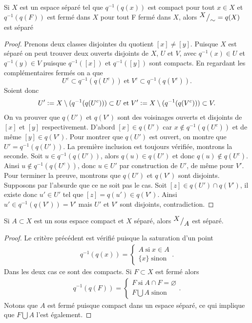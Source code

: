 \documentclass[main.tex]{subfiles}
\begin{document}
	\begin{prop}
		Si $X$ est un espace séparé tel que $q^{-1}(q(x))$ est compact pour tout  $x\in X$ et $q^{-1}(q(F))$ est fermé dans $X$ pour tout F fermé dans $X$, alors ${^{\textstyle X}\big/_{\textstyle \sim}} = q(X)$ est séparé
	\end{prop}
	\begin{proof}
		Prenons deux classes disjointes du quotient $[x] \neq [y]$. Puisque $X$ est séparé on peut trouver deux ouverts disjoints de $X$, $U$ et $V$, avec $q^{-1}(x) \in U$ et  $q^{-1}(y) \in V$ puisque $q^{-1}([x])$ et  $q^{-1}([y])$ sont compacts. En regardant les complémentaires fermés on a que \[
			U^c \subset q^{-1}(q(U^c)) \; \text{et} \; V^c \subset q^{-1}(q(V^c))
		.\] Soient donc \[
		U' \vcentcolon= X\setminus(q^{-1}(q(U^c))) \subset U \; \text{et} \; V' \vcentcolon= X\setminus(q^{-1}(q(V^c))) \subset V
	.\]  On va prouver que $q(U')$ et  $q(V')$ sont des voisinages ouverts et disjoints de $[x]$ et $[y]$ respectivement. 
	D'abord $[x] \in q(U')$ car  $x \not\in q^{-1}(q(U^c))$ et de même  $[y] \in q(V')$. Pour montrer que $q(U')$ est ouvert, on montre que  $U' = q^{-1}(q(U'))$. La première inclusion est toujours vérifiée, montrons la seconde. Soit $u \in q^{-1}(q(U'))$, alors $q(u) \in q(U')$ et donc $q(u) \not\in q(U^c)$. Ainsi  $u \not\in q^{-1}(q(U^c))$, donc $u \in U'$ par construction de $U'$, de même pour $V'$. \\
	Pour terminer la preuve, montrons que $q(U')$ et  $q(V')$ sont disjoints. Supposons par l'absurde que ce ne soit pas le cas. Soit $[z] \in q(U')\cap q(V')$, il existe donc $u' \in U'$ tel que  $[z] = q(u') \in q(V')$. Ainsi $u' \in q^{-1}(q(V')) = V'$ mais  $U'$ et  $V'$ sont disjoints, contradiction.
	\end{proof}
	\begin{cor}
		Si $A \subset X$ est un sous espace compact et $X$ séparé, alors ${^{\textstyle X}\big/_{\textstyle A}}$ est séparé.
	\end{cor}
	\begin{proof}
		Le critère précédent est vérifié puisque la saturation d'un point
		\begin{align*}
			q^{-1}(q(x)) = \begin{cases}
				A \; \text{si} \; x \in A \\
				\{x\} \; \text{sinon} 
			\end{cases}
		.\end{align*} Dans les deux cas ce sont des compacts.
		Si $F \subset X$ est fermé alors 
		\begin{align*}
			q^{-1}(q(F)) = \begin{cases}
				F \; \text{si} \; A\cap F = \varnothing \\
				F \bigcup A \; \text{sinon}
			\end{cases}
		.\end{align*} Notons que $A$ est fermé puisque compact dans un espace séparé, ce qui implique que  $F \bigcup A$ l'est également.
	\end{proof}
\end{document}

